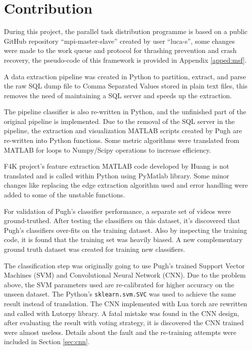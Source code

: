 \documentclass[bsc,logo,twoside,fullspacing,parskip]{infthesis}
\begin{document}
\section{Contribution}

During this project, the parallel task distribution programme is based on a public GitHub repository ``mpi-master-slave'' created by user ``luca-s''\cite{L5}, some changes were made to the work queue and protocol for thrashing prevention and crash recovery, the pseudo-code of this framework is provided in Appendix \ref{apped:msf}.

A data extraction pipeline was created in Python to partition, extract, and parse the raw SQL dump file to Comma Separated Values stored in plain text files, this removes the need of maintaining a SQL server and speeds up the extraction. 

The pipeline classifier is also re-written in Python, and the unfinished part of the original pipeline is implemented. 
Due to the removal of the SQL server in the pipeline, the extraction and visualization MATLAB scripts created by Pugh are re-written into Python functions. 
Some metric algorithms were translated from MATLAB for loops to Numpy/Scipy operations to increase efficiency.

F4K project's feature extraction MATLAB code developed by Huang\cite{Huang} is not translated and is called within Python using PyMatlab library. Some minor changes like replacing the edge extraction algorithm used and error handling were added to some of the unstable functions. 

For validation of Pugh's classifier performance, a separate set of videos were ground-truthed. After testing the classifiers on this dataset, it's discovered that Pugh's classifiers over-fits on the training dataset. Also by inspecting the training code, it is found that the training set was heavily biased. A new complementary ground truth dataset was created for training new classifiers. 

The classification step was originally going to use Pugh's trained Support Vector Machines (SVM) and Convolutional Neural Network (CNN). Due to the problem above, the SVM parameters used are re-calibrated for higher accuracy on the unseen dataset. 
The Python's {\tt sklearn.svm.SVC} was used to achieve the same result instead of translation. The CNN implemented with Lua torch are rewritten and called with Lutorpy library.
A fatal mistake was found in the CNN design, after evaluating the result with voting strategy, it is discovered the CNN trained were almost useless. Details about the fault and the re-training attempts were included in Section \ref{sec:cnn}.
\end{document}
